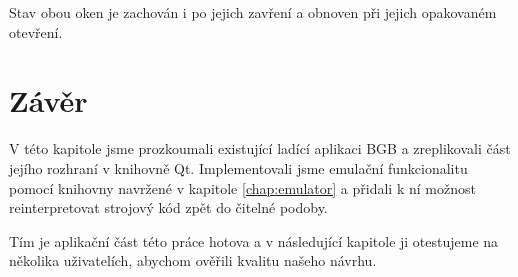 
Stav obou oken je zachován i po jejich zavření a obnoven při jejich opakovaném otevření.

\section{Závěr}

V této kapitole jsme prozkoumali existující ladící aplikaci BGB a zreplikovali část jejího rozhraní v knihovně Qt. Implementovali jsme emulační funkcionalitu pomocí knihovny navržené v kapitole \ref{chap:emulator} a přidali k ní možnost reinterpretovat strojový kód zpět do čitelné podoby.

Tím je aplikační část této práce hotova a v následující kapitole ji otestujeme na několika uživatelích, abychom ověřili kvalitu našeho návrhu.